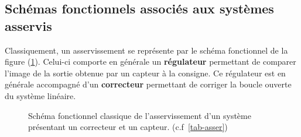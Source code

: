 \subsection{Schémas fonctionnels associés aux systèmes asservis}

Classiquement, un asservissement se représente par le schéma fonctionnel de 
la figure (\cref{fig-reg}). Celui-ci comporte en générale un \textbf{régulateur}
permettant de comparer l'image de la sortie obtenue par un capteur 
à la consigne. Ce régulateur est en générale accompagné d'un \textbf{correcteur}
permettant de corriger la boucle ouverte du système linéaire.

\begin{figure}[!h]
\centering
%                                      
\caption{Schéma fonctionnel classique de l'asservissement d'un système 
         présentant un correcteur et un capteur. (c.f~\cref{tab-asser})
         \label{fig-reg}}
\end{figure}


